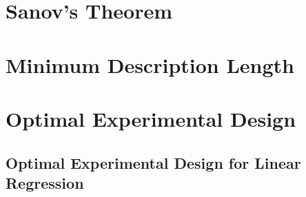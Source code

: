 \documentclass[11pt]{report} %
\begin{document}
\section{Sanov's Theorem}

\section{Minimum Description Length}

\section{Optimal Experimental Design}

\subsection{Optimal Experimental Design for Linear Regression}
\end{document}
